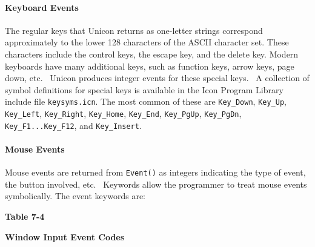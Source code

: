 \paragraph{Keyboard Events}
The regular keys that Unicon returns as one-letter strings correspond
approximately to the lower 128 characters of the ASCII character set.
These characters include the control keys, the escape key, and the
delete key. Modern keyboards have many additional keys, such as
function keys, arrow keys, {\textquotedbl}page down{\textquotedbl},
etc. \ Unicon produces integer events for these special keys. \ A
collection of symbol definitions for special keys is available in the
Icon Program Library include file \texttt{keysyms.icn}. The most common
of these are \texttt{Key\_Down}, \texttt{Key\_Up}, \texttt{Key\_Left},
\texttt{Key\_Right}, \texttt{Key\_Home}, \texttt{Key\_End},
\texttt{Key\_PgUp}, \texttt{Key\_PgDn}, \texttt{Key\_F1...Key\_F12},
and \texttt{Key\_Insert}.

\paragraph{Mouse Events}
Mouse events are returned from \texttt{Event()} as integers indicating
the type of event, the button involved, etc. \ Keywords allow the
programmer to treat mouse events symbolically. The event keywords are:

{\centering\sffamily\bfseries
Table 7-4
\par}

{\centering\sffamily\bfseries
Window Input Event Codes
\par}

